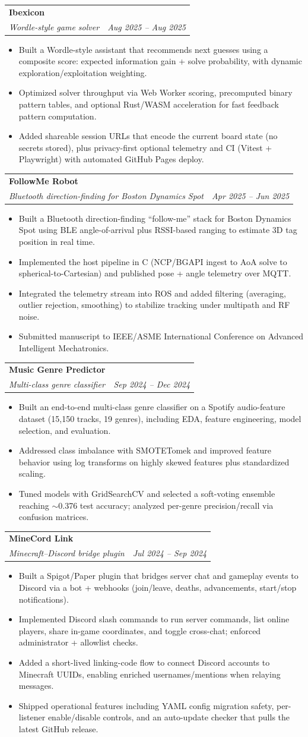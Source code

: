 \documentclass[letterpaper,11pt]{article}
\makeatletter
\newcommand{\resumeItem}[1]{
  \item\small{
    {#1 \vspace{-2pt}}
  }
}
\newcommand{\resumeSubheading}[4]{
  \vspace{-1pt}\item
    \begin{tabular*}{0.97\textwidth}[t]{l@{\extracolsep{\fill}}r}
      \textbf{#1} & #2 \\
      \textit{\small#3} & \textit{\small #4} \\
    \end{tabular*}\vspace{-5pt}
}
\newcommand{\resumeItemListStart}{\begin{itemize}}
\newcommand{\resumeItemListEnd}{\end{itemize}\vspace{-5pt}}
\makeatother
\begin{document}
    \resumeSubheading
      {Ibexicon}{}
      {Wordle-style game solver}{Aug 2025 -- Aug 2025}
      \resumeItemListStart
        \resumeItem{Built a Wordle-style assistant that recommends next guesses using a composite score: expected information gain + solve probability, with dynamic exploration/exploitation weighting.}
        \resumeItem{Optimized solver throughput via Web Worker scoring, precomputed binary pattern tables, and optional Rust/WASM acceleration for fast feedback pattern computation.}
        \resumeItem{Added shareable session URLs that encode the current board state (no secrets stored), plus privacy-first optional telemetry and CI (Vitest + Playwright) with automated GitHub Pages deploy.}
      \resumeItemListEnd

    \resumeSubheading
      {FollowMe Robot}{}
      {Bluetooth direction-finding for Boston Dynamics Spot}{Apr 2025 -- Jun 2025}
      \resumeItemListStart
        \resumeItem{Built a Bluetooth direction-finding ``follow-me'' stack for Boston Dynamics Spot using BLE angle-of-arrival plus RSSI-based ranging to estimate 3D tag position in real time.}
        \resumeItem{Implemented the host pipeline in C (NCP/BGAPI ingest to AoA solve to spherical-to-Cartesian) and published pose + angle telemetry over MQTT.}
        \resumeItem{Integrated the telemetry stream into ROS and added filtering (averaging, outlier rejection, smoothing) to stabilize tracking under multipath and RF noise.}
        \resumeItem{Submitted manuscript to IEEE/ASME International Conference on Advanced Intelligent Mechatronics.}
      \resumeItemListEnd

    \resumeSubheading
      {Music Genre Predictor}{}
      {Multi-class genre classifier}{Sep 2024 -- Dec 2024}
      \resumeItemListStart
        \resumeItem{Built an end-to-end multi-class genre classifier on a Spotify audio-feature dataset (15,150 tracks, 19 genres), including EDA, feature engineering, model selection, and evaluation.}
        \resumeItem{Addressed class imbalance with SMOTETomek and improved feature behavior using log transforms on highly skewed features plus standardized scaling.}
        \resumeItem{Tuned models with GridSearchCV and selected a soft-voting ensemble reaching $\sim$0.376 test accuracy; analyzed per-genre precision/recall via confusion matrices.}
      \resumeItemListEnd

    \resumeSubheading
      {MineCord Link}{}
      {Minecraft--Discord bridge plugin}{Jul 2024 -- Sep 2024}
      \resumeItemListStart
        \resumeItem{Built a Spigot/Paper plugin that bridges server chat and gameplay events to Discord via a bot + webhooks (join/leave, deaths, advancements, start/stop notifications).}
        \resumeItem{Implemented Discord slash commands to run server commands, list online players, share in-game coordinates, and toggle cross-chat; enforced administrator + allowlist checks.}
        \resumeItem{Added a short-lived linking-code flow to connect Discord accounts to Minecraft UUIDs, enabling enriched usernames/mentions when relaying messages.}
        \resumeItem{Shipped operational features including YAML config migration safety, per-listener enable/disable controls, and an auto-update checker that pulls the latest GitHub release.}
      \resumeItemListEnd
\end{document}

